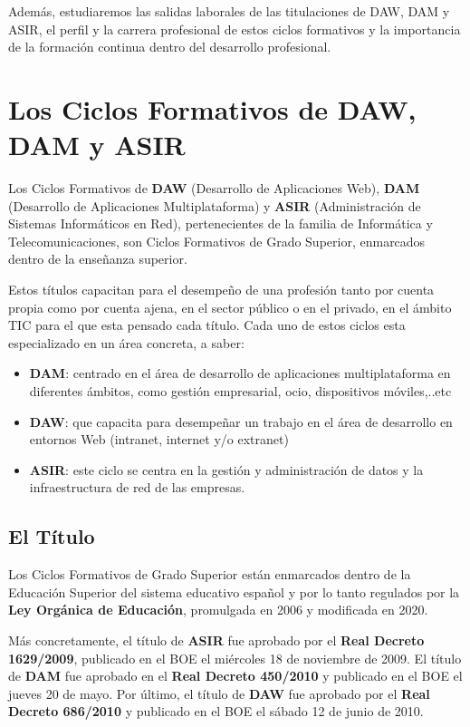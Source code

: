 Además, estudiaremos las salidas laborales de las titulaciones de DAW, DAM y ASIR, el perfil y la carrera profesional de estos ciclos formativos y la importancia de la formación continua dentro del desarrollo profesional.

\section{Los Ciclos Formativos de DAW, DAM y ASIR}
Los Ciclos Formativos de \textbf{DAW} (Desarrollo de Aplicaciones Web), \textbf{DAM} (Desarrollo de Aplicaciones Multiplataforma) y \textbf{ASIR} (Administración de Sistemas Informáticos en Red), pertenecientes de la familia de Informática y Telecomunicaciones, son Ciclos Formativos de Grado Superior, enmarcados dentro de la enseñanza superior.

Estos títulos capacitan para el desempeño de una profesión tanto por cuenta propia como por cuenta ajena, en el sector público o en el privado, en el ámbito TIC para el que esta pensado cada título. Cada uno de estos ciclos esta especializado en un área concreta, a saber:

 \begin{itemize}
 	\item \textbf{DAM}: centrado en el área de desarrollo de aplicaciones multiplataforma en diferentes ámbitos, como gestión empresarial, ocio, dispositivos móviles,..etc
 	\item \textbf{DAW}: que capacita para desempeñar un trabajo en el área de desarrollo en entornos Web (intranet, internet y/o extranet)
 	\item \textbf{ASIR}: este ciclo se centra en la gestión y administración de datos y la infraestructura de red de las empresas.
 \end{itemize}

\subsection{El Título}
 Los Ciclos Formativos de Grado Superior están enmarcados dentro de la Educación Superior del sistema educativo español y por lo tanto regulados por la \textbf{Ley Orgánica de Educación}, promulgada en 2006 y modificada en 2020.

 Más concretamente, el título de \textbf{ASIR} fue aprobado por el \textbf{Real Decreto 1629/2009}, publicado en el BOE el miércoles 18 de noviembre de 2009. El título de \textbf{DAM} fue aprobado en el \textbf{Real Decreto 450/2010} y publicado en el BOE el jueves 20 de mayo. Por último, el título de \textbf{DAW} fue aprobado por el \textbf{Real Decreto 686/2010} y publicado en el BOE el sábado 12 de junio de 2010.



